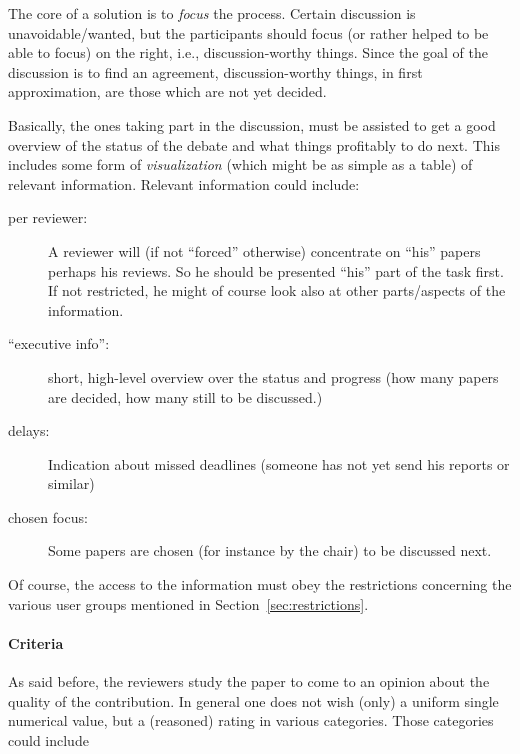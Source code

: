 The core of a solution is to \emph{focus} the process. Certain discussion
is unavoidable/wanted, but the participants should focus (or rather helped
to be able to focus) on the right, i.e., discussion-worthy things. Since
the goal of the discussion is to find an agreement, discussion-worthy
things, in first approximation, are those which are not yet decided.

Basically, the ones taking part in the discussion, must be assisted to get
a good overview of the status of the debate and what things profitably to
do next. This includes some form of \emph{visualization} (which might be as
simple as a table) of relevant information. Relevant information could
include:

\begin{description}
\item[per reviewer:] A reviewer will (if not ``forced'' otherwise)
  concentrate on ``his'' papers perhaps his reviews.  So he should be
  presented ``his'' part of the task first. If not restricted, he might of
  course look also at other parts/aspects of the information.
\item[``executive info'':] short, high-level overview over the status and
  progress (how many papers are decided, how many still to be discussed.)
\item[delays:] Indication about missed deadlines (someone has not yet send
  his reports or similar)
\item[chosen focus:] Some papers are chosen (for instance by the chair) to
  be discussed next.
\end{description}

Of course, the access to the information must obey the restrictions
concerning the various user groups mentioned in
Section~\ref{sec:restrictions}.






\paragraph{Criteria}
\label{sec:criteria}

As said before, the reviewers study the paper to come to an opinion about
the quality of the contribution. In general one does not wish (only) a
uniform single numerical value, but a (reasoned) rating in various
categories. Those categories could include


